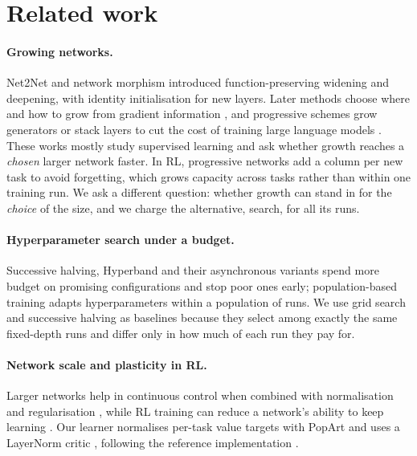 \documentclass{article}
\begin{document}
\section{Related work}

\paragraph{Growing networks.}
Net2Net \citep{chen2016net2net} and network morphism \citep{wei2016morphism} introduced function-preserving widening and deepening, with identity initialisation for new layers.
Later methods choose where and how to grow from gradient information \citep{wu2020firefly,evci2022gradmax}, and progressive schemes grow generators \citep{karras2018progressive} or stack layers to cut the cost of training large language models \citep{gong2019stacking}.
These works mostly study supervised learning and ask whether growth reaches a \emph{chosen} larger network faster.
In RL, progressive networks \citep{rusu2016progressive} add a column per new task to avoid forgetting, which grows capacity across tasks rather than within one training run.
We ask a different question: whether growth can stand in for the \emph{choice} of the size, and we charge the alternative, search, for all its runs.

\paragraph{Hyperparameter search under a budget.}
Successive halving, Hyperband and their asynchronous variants \citep{jamieson2016sh,li2018hyperband,li2020asha} spend more budget on promising configurations and stop poor ones early; population-based training \citep{jaderberg2017pbt} adapts hyperparameters within a population of runs.
We use grid search and successive halving as baselines because they select among exactly the same fixed-depth runs and differ only in how much of each run they pay for.

\paragraph{Network scale and plasticity in RL.}
Larger networks help in continuous control when combined with normalisation and regularisation \citep{nauman2024bro,lee2025simba}, while RL training can reduce a network's ability to keep learning \citep{nikishin2022primacy,lyle2023plasticity,dohare2024loss}.
Our learner normalises per-task value targets with PopArt \citep{vanhasselt2016popart,hessel2019popart} and uses a LayerNorm critic \citep{ba2016layernorm}, following the reference implementation \citep{li2026toppo}.
\end{document}
